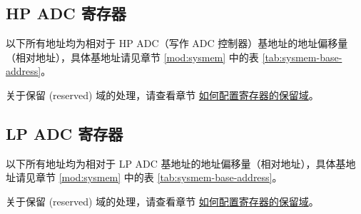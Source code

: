 \documentclass[main\_\_CN.tex]{subfiles}
\begin{document}
\subsection{HP ADC 寄存器}

以下所有地址均为相对于 HP ADC（写作 ADC 控制器）基地址的地址偏移量（相对地址），具体基地址请见章节 \ref{mod:sysmem} \textit{} 中的表 \ref{tab:sysmem-base-address}。

关于保留 (reserved) 域的处理，请查看章节 \hyperref[programming-reserved-field]{如何配置寄存器的保留域}。



\subsection{LP ADC 寄存器}

以下所有地址均为相对于 LP ADC 基地址的地址偏移量（相对地址），具体基地址请见章节 \ref{mod:sysmem} \textit{} 中的表 \ref{tab:sysmem-base-address}。

关于保留 (reserved) 域的处理，请查看章节 \hyperref[programming-reserved-field]{如何配置寄存器的保留域}。


\end{document}
